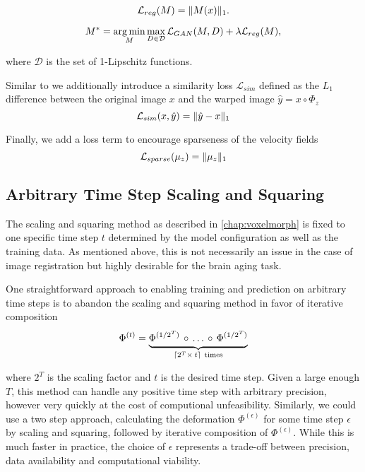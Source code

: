 \begin{equation}
	\mathcal{L}_{reg} (M) = \lVert M(x)\rVert_1.
\end{equation}

\begin{equation}
	M^* = \operatorname*{arg\,min}_M \max_{D \in \mathcal{D}} \mathcal{L}_{GAN}(M, D) + \lambda \mathcal{L}_{reg} (M),
\end{equation}

where $\mathcal{D}$ is the set of 1-Lipschitz functions.

Similar to \cite{VAGAN} we additionally introduce a similarity loss $\mathcal{L}_{sim}$ defined as the $L_1$ difference between the original image $x$ and the warped image $\hat y = x \circ \Phi_z$
\begin{equation}
	\mathcal{L}_{sim}( x, \hat y ) = \lVert \hat y - x \rVert_1
\end{equation}

Finally, we add a loss term to encourage sparseness of the velocity fields
\begin{equation}
	\mathcal{L}_{sparse}( \mu_z ) = \lVert\mu_z\rVert_1
\end{equation}


\subsection{Arbitrary Time Step Scaling and Squaring}
The scaling and squaring method as described in \autoref{chap:voxelmorph} is fixed to one specific time step $t$ determined by the model configuration as well as the training data. As mentioned above, this is not necessarily an issue in the case of image registration but highly desirable for the brain aging task.

One straightforward approach to enabling training and prediction on arbitrary time steps is to abandon the scaling and squaring method in favor of iterative composition
\begin{equation}
	\Phi^{(t)} =
	\underbrace{
		\Phi^{(1 / 2^T)} \, \circ \, \ldots \, \circ \, \Phi^{(1 / 2^T)} \vphantom{\Phi^{(1 / 2^T)}_2}
	}_{\lceil 2^T \times \: t \rceil \ \text{times}}
\end{equation}

where $2^T$ is the scaling factor and $t$ is the desired time step. Given a large enough $T$, this method can handle any positive time step with arbitrary precision, however very quickly at the cost of computional unfeasibility. Similarly, we could use a two step approach, calculating the deformation $\Phi^{(\epsilon)}$ for some time step $\epsilon$ by scaling and squaring, followed by iterative composition of $\Phi^{(\epsilon)}$. While this is much faster in practice, the choice of $\epsilon$ represents a trade-off between precision, data availability and computational viability.

